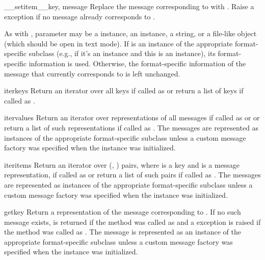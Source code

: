 \begin{methoddesc}{__setitem__}{key, message}
Replace the message corresponding to  with . Raise a
 exception if no message already corresponds to .

As with , parameter  may be a 
instance, an  instance, a string, or a file-like
object (which should be open in text mode). If  is an instance of
the appropriate format-specific  subclass (e.g., if it's an
 instance and this is an  instance), its
format-specific information is used. Otherwise, the format-specific information
of the message that currently corresponds to  is left unchanged. 
\end{methoddesc}

\begin{methoddesc}{iterkeys}{}
Return an iterator over all keys if called as  or return a
list of keys if called as .
\end{methoddesc}

\begin{methoddesc}{itervalues}{}
Return an iterator over representations of all messages if called as
 or  or return a list of such
representations if called as . The messages are represented as
instances of the appropriate format-specific  subclass unless a
custom message factory was specified when the  instance was
initialized. 
\end{methoddesc}

\begin{methoddesc}{iteritems}{}
Return an iterator over (, ) pairs, where  is a
key and  is a message representation, if called as
 or return a list of such pairs if called as
. The messages are represented as instances of the appropriate
format-specific  subclass unless a custom message factory was
specified when the  instance was initialized.
\end{methoddesc}

\begin{methoddesc}{get}{key}
Return a representation of the message corresponding to . If no such
message exists,  is returned if the method was called as
 and a  exception is raised if the method was
called as . The message is represented as an instance of
the appropriate format-specific  subclass unless a custom
message factory was specified when the  instance was
initialized.
\end{methoddesc}

